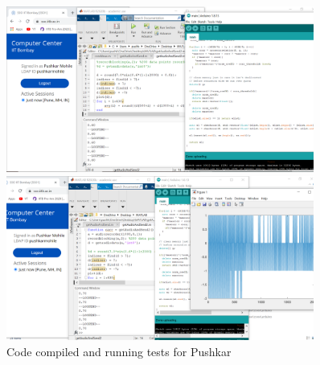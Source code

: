 \begin{figure}[pt]
    \centering
    \includegraphics[width=0.9\textwidth]{fig/pushkcompile1.png}

    \includegraphics[width=0.9\textwidth]{fig/pushkcompile2.png}
    \caption{Code compiled and running tests for Pushkar}
    \label{fig:pushkcompile}
\end{figure}


